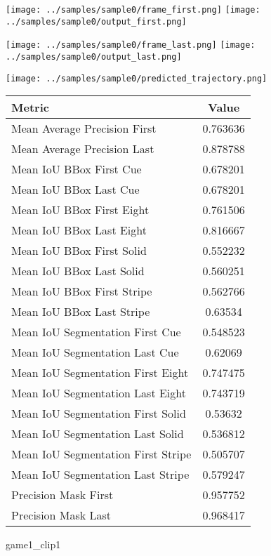 \begin{figure}
\texttt{[image: ../samples/sample0/frame\_first.png]}
\texttt{[image: ../samples/sample0/output\_first.png]}\par
\texttt{[image: ../samples/sample0/frame\_last.png]}
\texttt{[image: ../samples/sample0/output\_last.png]}\par
\centering
\texttt{[image: ../samples/sample0/predicted\_trajectory.png]}
\caption{game1\_clip1}
\vspace{10pt}
\begin{tabular}{|l|c|}
\hline
\textbf{Metric} & \textbf{Value} \\
\hline
Mean Average Precision First & 0.763636 \\
Mean Average Precision Last & 0.878788 \\
\hline
Mean IoU BBox First Cue & 0.678201 \\
Mean IoU BBox Last Cue & 0.678201 \\
Mean IoU BBox First Eight & 0.761506 \\
Mean IoU BBox Last Eight & 0.816667 \\
Mean IoU BBox First Solid & 0.552232 \\
Mean IoU BBox Last Solid & 0.560251 \\
Mean IoU BBox First Stripe & 0.562766 \\
Mean IoU BBox Last Stripe & 0.63534 \\
\hline
Mean IoU Segmentation First Cue & 0.548523 \\
Mean IoU Segmentation Last Cue & 0.62069 \\
Mean IoU Segmentation First Eight & 0.747475 \\
Mean IoU Segmentation Last Eight & 0.743719 \\
Mean IoU Segmentation First Solid & 0.53632 \\
Mean IoU Segmentation Last Solid & 0.536812 \\
Mean IoU Segmentation First Stripe & 0.505707 \\
Mean IoU Segmentation Last Stripe & 0.579247 \\
\hline
Precision Mask First & 0.957752 \\
Precision Mask Last & 0.968417 \\
\hline
\end{tabular} 
\end{figure}

